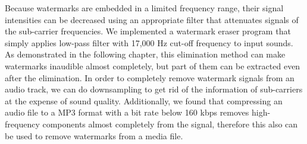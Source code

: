 Because watermarks are embedded in a limited frequency range, their signal intensities can be decreased using an appropriate filter that attenuates signals of the sub-carrier frequencies.
We implemented a watermark eraser program that simply applies low-pass filter with 17,000 Hz cut-off frequency to input sounds.
As demonstrated in the following chapter, this elimination method can make watermarks inaudible almost completely, but part of them can be extracted even after the elimination.
In order to completely remove watermark signals from an audio track, we can do downsampling to get rid of the information of sub-carriers at the expense of sound quality.
Additionally, we found that compressing an audio file to a MP3 format with a bit rate below 160 kbps removes high-frequency components almost completely from the signal, therefore this also can be used to remove watermarks from a media file.
